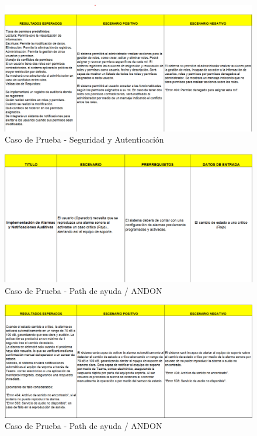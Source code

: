 \documentclass[12pt,letterpaper,spanish, xcolor=table]{report}
\numberwithin{figure}{subsection}
\begin{document}
	\begin{figure}[H]
		\centering
		\includegraphics[width=1.0\textwidth]
		{Imagenes/PathAyuda/CPSeguridadAutenticacion2.png}
		\caption{Caso de Prueba - Seguridad y  Autenticación
		}\label{a2}
	\end{figure}
	
	\begin{figure}[H]
		\centering
		\includegraphics[width=1.0\textwidth]
		{Imagenes/PathAyuda/CPPathAyuda.png}
		\caption{Caso de Prueba - Path de ayuda /  ANDON
		}\label{a2}
	\end{figure}
	
	\begin{figure}[H]
		\centering
		\includegraphics[width=1.0\textwidth]
		{Imagenes/PathAyuda/CPPathAyuda2.png}
		\caption{Caso de Prueba - Path de ayuda /  ANDON
		}\label{a2}
	\end{figure}
	
\end{document}
